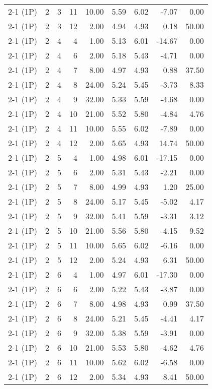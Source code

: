 \begin{tabular}{lrrrrrrrr}
2-1 (1P) & 2 & 3 & 11 & 10.00 & 5.59 & 6.02 & -7.07 & 0.00 \\
2-1 (1P) & 2 & 3 & 12 & 2.00 & 4.94 & 4.93 & 0.18 & 50.00 \\
2-1 (1P) & 2 & 4 & 4 & 1.00 & 5.13 & 6.01 & -14.67 & 0.00 \\
2-1 (1P) & 2 & 4 & 6 & 2.00 & 5.18 & 5.43 & -4.71 & 0.00 \\
2-1 (1P) & 2 & 4 & 7 & 8.00 & 4.97 & 4.93 & 0.88 & 37.50 \\
2-1 (1P) & 2 & 4 & 8 & 24.00 & 5.24 & 5.45 & -3.73 & 8.33 \\
2-1 (1P) & 2 & 4 & 9 & 32.00 & 5.33 & 5.59 & -4.68 & 0.00 \\
2-1 (1P) & 2 & 4 & 10 & 21.00 & 5.52 & 5.80 & -4.84 & 4.76 \\
2-1 (1P) & 2 & 4 & 11 & 10.00 & 5.55 & 6.02 & -7.89 & 0.00 \\
2-1 (1P) & 2 & 4 & 12 & 2.00 & 5.65 & 4.93 & 14.74 & 50.00 \\
2-1 (1P) & 2 & 5 & 4 & 1.00 & 4.98 & 6.01 & -17.15 & 0.00 \\
2-1 (1P) & 2 & 5 & 6 & 2.00 & 5.31 & 5.43 & -2.21 & 0.00 \\
2-1 (1P) & 2 & 5 & 7 & 8.00 & 4.99 & 4.93 & 1.20 & 25.00 \\
2-1 (1P) & 2 & 5 & 8 & 24.00 & 5.17 & 5.45 & -5.02 & 4.17 \\
2-1 (1P) & 2 & 5 & 9 & 32.00 & 5.41 & 5.59 & -3.31 & 3.12 \\
2-1 (1P) & 2 & 5 & 10 & 21.00 & 5.56 & 5.80 & -4.15 & 9.52 \\
2-1 (1P) & 2 & 5 & 11 & 10.00 & 5.65 & 6.02 & -6.16 & 0.00 \\
2-1 (1P) & 2 & 5 & 12 & 2.00 & 5.24 & 4.93 & 6.31 & 50.00 \\
2-1 (1P) & 2 & 6 & 4 & 1.00 & 4.97 & 6.01 & -17.30 & 0.00 \\
2-1 (1P) & 2 & 6 & 6 & 2.00 & 5.22 & 5.43 & -3.87 & 0.00 \\
2-1 (1P) & 2 & 6 & 7 & 8.00 & 4.98 & 4.93 & 0.99 & 37.50 \\
2-1 (1P) & 2 & 6 & 8 & 24.00 & 5.21 & 5.45 & -4.41 & 4.17 \\
2-1 (1P) & 2 & 6 & 9 & 32.00 & 5.38 & 5.59 & -3.91 & 0.00 \\
2-1 (1P) & 2 & 6 & 10 & 21.00 & 5.53 & 5.80 & -4.62 & 4.76 \\
2-1 (1P) & 2 & 6 & 11 & 10.00 & 5.62 & 6.02 & -6.58 & 0.00 \\
2-1 (1P) & 2 & 6 & 12 & 2.00 & 5.34 & 4.93 & 8.41 & 50.00 \\

\end{tabular}
